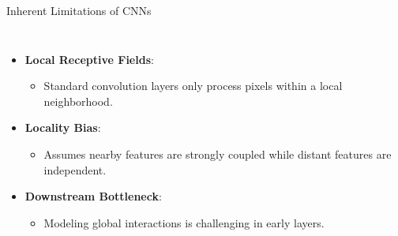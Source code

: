 \documentclass[aspectratio=169,10pt]{beamer}
\begin{document}
\begin{frame}{Inherent Limitations of CNNs}
\begin{columns}[T,onlytextwidth]
\begin{itemize}
    \item \textbf{Local Receptive Fields}: 
    \begin{itemize}
        \item Standard convolution layers only process pixels within a local neighborhood.
    \end{itemize}
    \item \textbf{Locality Bias}:
    \begin{itemize}
        \item Assumes nearby features are strongly coupled while distant features are independent.
    \end{itemize}
    \item \textbf{Downstream Bottleneck}:
    \begin{itemize}
        \item Modeling global interactions is challenging in early layers.
    \end{itemize}
\end{itemize}

\centering
{}
\end{columns}
\end{frame}
\end{document}
